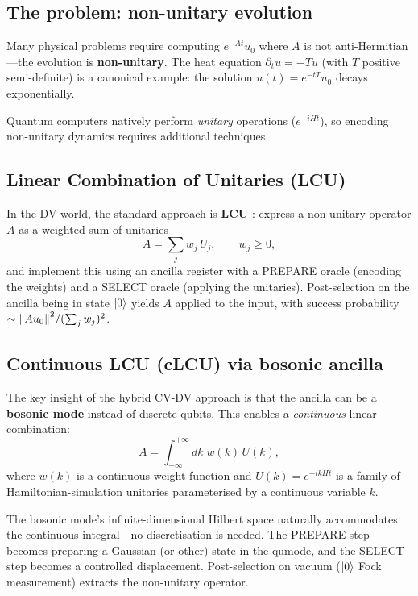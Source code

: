\documentclass[11pt]{article}
\begin{document}
\subsection{The problem: non-unitary evolution}

Many physical problems require computing $e^{-At}u_0$ where $A$ is not
anti-Hermitian---the evolution is \textbf{non-unitary}.
The heat equation $\partial_t u = -T u$ (with $T$ positive semi-definite)
is a canonical example: the solution $u(t) = e^{-tT}u_0$ decays
exponentially.

Quantum computers natively perform \emph{unitary} operations
($e^{-iHt}$), so encoding non-unitary dynamics requires additional
techniques.

\subsection{Linear Combination of Unitaries (LCU)}

In the DV world, the standard approach is \textbf{LCU}
\cite{Childs2012,Berry2015}: express a non-unitary operator $A$ as a
weighted sum of unitaries
\begin{equation}
A = \sum_j w_j\, U_j, \qquad w_j \geq 0,
\end{equation}
and implement this using an ancilla register with a PREPARE oracle
(encoding the weights) and a SELECT oracle (applying the unitaries).
Post-selection on the ancilla being in state $\ket{0}$ yields $A$
applied to the input, with success probability
$\sim \norm{Au_0}^2/(\sum_j w_j)^2$.

\subsection{Continuous LCU (cLCU) via bosonic ancilla}

The key insight of the hybrid CV-DV approach is that the ancilla can be a
\textbf{bosonic mode} instead of discrete qubits.
This enables a \emph{continuous} linear combination:
\begin{equation}\label{eq:clcu}
A = \int_{-\infty}^{+\infty} dk\; w(k)\, U(k),
\end{equation}
where $w(k)$ is a continuous weight function and $U(k) = e^{-ikHt}$ is a
family of Hamiltonian-simulation unitaries parameterised by a continuous
variable $k$.

The bosonic mode's infinite-dimensional Hilbert space naturally
accommodates the continuous integral---no discretisation is needed.
The PREPARE step becomes preparing a Gaussian (or other) state in the
qumode, and the SELECT step becomes a controlled displacement.
Post-selection on vacuum ($\ket{0}$ Fock measurement) extracts the
non-unitary operator.
\end{document}
